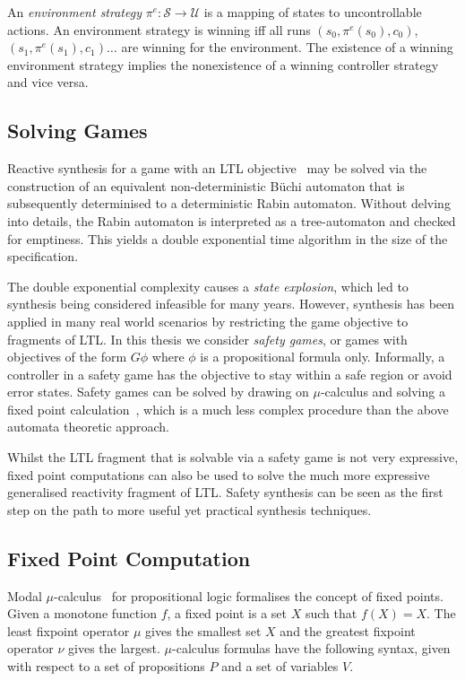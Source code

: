 An \emph{environment strategy} $\pi^e : \mathcal{S} \to \mathcal{U}$ is a mapping of states to uncontrollable actions. An environment strategy is winning
iff all runs $(s_0, \pi^e(s_0), c_0)$, $(s_1, \pi^e(s_1), c_1) \dots$ are winning for the environment. The existence of a winning environment strategy implies the nonexistence of a winning controller strategy and vice versa.

\subsection{Solving Games}

Reactive synthesis for a game with an LTL objective~\cite{Pnueli89} may be solved via the construction of an equivalent non-deterministic B\"uchi automaton that is subsequently determinised to a deterministic Rabin automaton. Without delving into details, the Rabin automaton is interpreted as a tree-automaton and checked for emptiness. This yields a double exponential time algorithm in the size of the specification.

The double exponential complexity causes a \emph{state explosion}, which led to synthesis being considered infeasible for many years. However, synthesis has been applied in many real world scenarios by restricting the game objective to fragments of LTL. In this thesis we consider \emph{safety games}, or games with objectives of the form $G \phi$ where $\phi$ is a propositional formula only. Informally, a controller in a safety game has the objective to stay within a safe region or avoid error states. Safety games can be solved by drawing on $\mu$-calculus and solving a fixed point calculation~\cite{Asarin95}, which is a much less complex procedure than the above automata theoretic approach. 

Whilst the LTL fragment that is solvable via a safety game is not very expressive, fixed point computations can also be used to solve the much more expressive generalised reactivity fragment of LTL. Safety synthesis can be seen as the first step on the path to more useful yet practical synthesis techniques.


\subsection{Fixed Point Computation}

Modal $\mu$-calculus~\cite{Kozen82} for propositional logic formalises the concept of fixed points. Given a monotone function $f$, a fixed point is a set $X$ such that $f(X) = X$. The least fixpoint operator $\mu$ gives the smallest set $X$ and the greatest fixpoint operator $\nu$ gives the largest. $\mu$-calculus formulas have the following syntax, given with respect to a set of propositions $P$ and a set of variables $V$.

